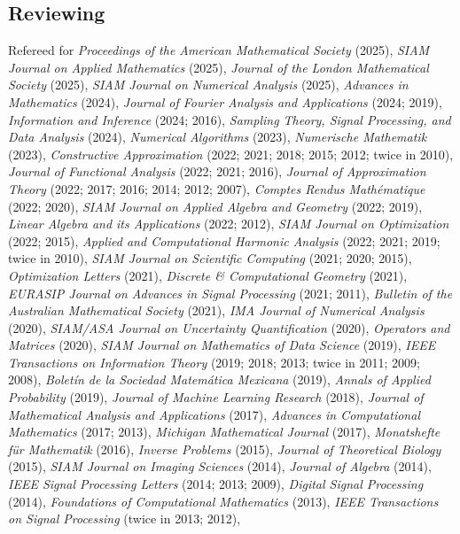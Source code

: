 \documentclass[11pt]{article}
\begin{document}
\subsection{Reviewing}
\bitemize
\item Refereed for 
{\sl Proceedings of the American Mathematical Society} (2025),
{\sl SIAM Journal on Applied Mathematics} (2025),
{\sl Journal of the London Mathematical Society} (2025),
{\sl SIAM Journal on Numerical Analysis} (2025),
{\sl Advances in Mathematics} (2024),
{\sl Journal of Fourier Analysis and Applications} (2024; 2019),
{\sl Information and Inference} (2024; 2016),
{\sl Sampling Theory, Signal Processing, and Data Analysis} (2024),
{\sl Numerical Algorithms} (2023),
{\sl Numerische Mathematik} (2023),
{\sl Constructive Approximation} (2022; 2021; 2018; 2015; 2012; twice in 2010),
{\sl Journal of Functional Analysis} (2022; 2021; 2016),
{\sl Journal of Approximation Theory} (2022; 2017; 2016; 2014; 2012; 2007),
{\sl Comptes Rendus Math\'ematique} (2022; 2020),
{\sl SIAM Journal on Applied Algebra and Geometry} (2022; 2019),
{\sl Linear Algebra and its Applications} (2022; 2012),
{\sl SIAM Journal on Optimization} (2022; 2015),
{\sl Applied and Computational Harmonic Analysis} (2022; 2021; 2019; twice in 2010),
{\sl SIAM Journal on Scientific Computing} (2021; 2020; 2015),
{\sl Optimization Letters} (2021),
{\sl Discrete \& Computational Geometry} (2021),
{\sl EURASIP Journal on Advances in Signal Processing} (2021; 2011),
{\sl Bulletin of the Australian Mathematical Society} (2021),
{\sl IMA Journal of Numerical Analysis} (2020),
{\sl SIAM/ASA Journal on Uncertainty Quantification} (2020),
{\sl Operators and Matrices} (2020),
{\sl SIAM Journal on Mathematics of Data Science} (2019),
{\sl IEEE Transactions on Information Theory} (2019; 2018; 2013; twice in 2011; 2009; 2008),
{\sl Bolet\'in de la Sociedad Matem\'atica Mexicana} (2019),
{\sl Annals of Applied Probability} (2019),
{\sl Journal of Machine Learning Research} (2018),
{\sl Journal of Mathematical Analysis and Applications} (2017),
{\sl Advances in Computational Mathematics} (2017; 2013),
{\sl Michigan Mathematical Journal} (2017),
{\sl Monatshefte f\"ur Mathematik} (2016),
{\sl Inverse Problems} (2015),
{\sl Journal of Theoretical Biology} (2015),
{\sl SIAM Journal on Imaging Sciences} (2014),
{\sl Journal of Algebra} (2014),
{\sl IEEE Signal Processing Letters} (2014; 2013; 2009),
{\sl Digital Signal Processing} (2014),
{\sl \mbox{Foundations} of Computational Mathematics} (2013),
{\sl IEEE Transactions on Signal Processing} (twice in 2013; 2012), 
\end{document}

